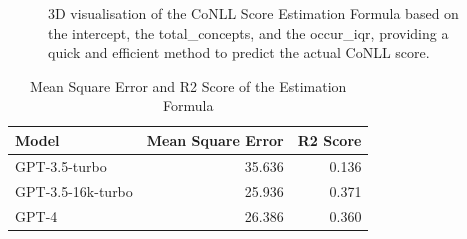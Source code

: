 \begin{figure}[htpb]
  \centering
  \quad 
  \caption[CoNLL Score Estimation]{3D visualisation of the CoNLL Score Estimation Formula based on the intercept, the total\_concepts, and the occur\_iqr, providing a quick and efficient method to predict the actual CoNLL score.}\label{fig:esimated-conll}
\end{figure}


\begin{table}[h]
    \centering
    \begin{tabular}{lrr}
        \hline
        Model & Mean Square Error & R2 Score \\
        \hline
        GPT-3.5-turbo & 35.636 & 0.136 \\
        GPT-3.5-16k-turbo & 25.936 & 0.371 \\
        GPT-4 & 26.386 & 0.360 \\
        \hline
    \end{tabular}
    \caption{Mean Square Error and R2 Score of the Estimation Formula}
    \label{tab:mse-r2}
\end{table}

